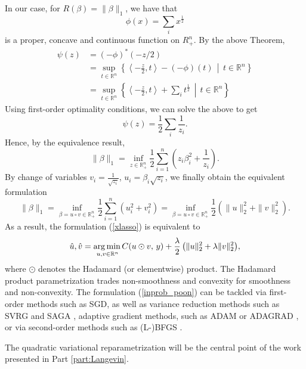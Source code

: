 \documentclass[11pt, twoside]{report}
\begin{document}
In our case, for $R(\beta) = \|\beta\|_1$, we have that 
\[\phi(x) = \sum_i x^{\frac{1}{2}}\]
is a proper, concave and continuous function on $R^n_+$. By the above Theorem,
\begin{align*}
    \psi(z) &= (-\phi)^*(-z/2) \\
            &= \sup_{t \in \mathbb{R}^n} \left\{ \left\langle -\frac{z}{2},t \right\rangle - (-\phi)(t) \, \middle| \, t\in\mathbb{R}^n\right\} \\
            &= \sup_{t \in \mathbb{R}^n} \left\{ \left\langle -\frac{z}{2},t \right\rangle + \sum_i t^{\frac{1}{2}} \, \middle| \, t\in\mathbb{R}^n\right\}
\end{align*}
Using first-order optimality conditions, we can solve the above to get
\[\psi(z) = \frac{1}{2} \sum_i \frac{1}{z_i}.\]
Hence, by the equivalence result,
\begin{equation} \label{quad_form_l1}
    \|\beta\|_1 = \inf_{z \in \mathbb{R}^n_+} \frac{1}{2} \sum_{i=1}^n  \left( z_i \beta_i^2 + \frac{1}{z_i} \right).
\end{equation}
By change of variables $v_i = \frac{1}{\sqrt{z_i}}$, $u_i = \beta_i\sqrt{z_i}$, we finally obtain the equivalent formulation
\begin{equation} \label{uv_form_l1}
    \|\beta\|_1 = \inf_{\beta = u \circ v \in \mathbb{R}^n_+} \frac{1}{2} \sum_{i=1}^n  \left( u_i^2 + v_i^2 \right) = \inf_{\beta = u \circ v \in \mathbb{R}^n_+} \frac{1}{2} \left( \|u\|_2^2 + \|v\|_2^2 \right).
\end{equation}
As a result, the formulation (\ref{xlasso}) is equivalent to 
\begin{equation} \label{inprob_poon}
    \hat{u},\hat{v} = \underset{u,v \in \mathbb{R}^{n}} {\operatorname*{arg\, min \,}}{C(u \odot v, \,y) + \frac \lambda 2 \left( \|u\|^2_2 + \lambda \|v\|^2_2 \right)},
\end{equation}
where $\odot$ denotes the Hadamard (or elementwise) product. The Hadamard product parametrization trades non-smoothness and convexity for smoothness and non-convexity. The formulation (\ref{inprob_poon}) can be tackled via first-order methods such as SGD, as well as variance reduction methods such as SVRG and SAGA \cite{defazio2014saga, johnson2013accelerating}, adaptive gradient methods, such as ADAM or ADAGRAD \cite{kingma2014adam, gupta2014training}, or via second-order methods such as (L-)BFGS \cite{liu1989limited}.

The quadratic variational reparametrization will be the central point of the work presented in Part \ref{part:Langevin}.

\end{document}
